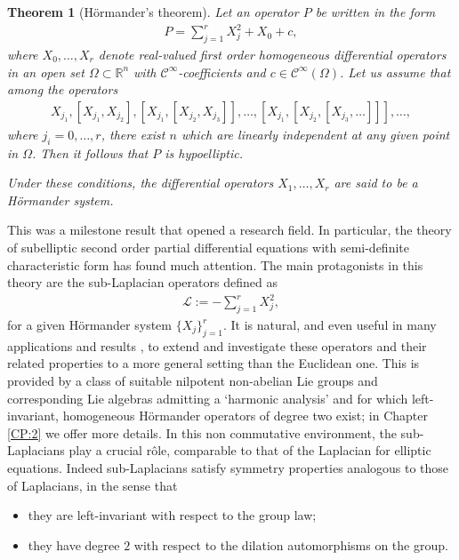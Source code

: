 \documentclass[12pt,oneside,a4paper]{book}
\numberwithin{equation}{section}     %
\theoremstyle{plain}
\newtheorem{theorem}{Theorem}[section]
\theoremstyle{definition}
\newcommand{\R}{{\mathbb R}}
\newcommand{\Rn}{{\R}^n}
\newcommand{\slp}{{\mathcal L}}
\begin{document}
\begin{theorem}[H\"ormander's theorem]\label{THM:Hormander}
	Let an operator $P$ be written in the form
	\begin{align}\label{EQ:HormOp}
	P=\sum_{j=1}^{r}X_j^2+X_0+c,
	\end{align}
	where $X_0,\dots,X_r$ denote real-valued first order homogeneous differential operators in an open set $\Omega\subset\Rn$ with $\mathcal{C}^\infty$-coefficients and $c\in\mathcal{C}^\infty(\Omega)$. Let us assume that among the operators 
	\begin{align*}
	X_{j_1},[X_{j_1},X_{j_2}],[X_{j_1},[X_{j_2},X_{j_3}]],\dots,[X_{j_1},[X_{j_2},[X_{j_3},\dots]]],\dots,
	\end{align*}
	where $j_i=0,\dots,r$, there exist $n$ which are linearly independent at any given point in $\Omega$. Then it follows that $P$ is hypoelliptic. 
	
	Under these conditions, the differential operators $X_1,\dots,X_r$ are said to be a \textit{H\"ormander system}.
\end{theorem}
This was a milestone result that opened a research field. In particular, the theory of subelliptic second order partial differential equations with semi-definite characteristic form has found much attention. 
The main protagonists in this theory are the sub-Laplacian operators defined as
\begin{align*}
\slp:=-\sum_{j=1}^r X_j^2,
\end{align*}
for a given H\"ormander system $\{X_j\}_{j=1}^r$. It is natural, and even useful in many applications and results \cite{F75,FS-CPAM,S1973}, to extend and investigate these operators and their related properties to a more general setting than the Euclidean one. This is provided by a class of suitable nilpotent non-abelian Lie groups and corresponding Lie algebras admitting a `harmonic analysis' and for which left-invariant, homogeneous H\"ormander operators of degree two exist; in Chapter \ref{CP:2} we offer more details. In this non commutative environment, the sub-Laplacians play a crucial r\^ole, comparable to that of the Laplacian for elliptic equations. Indeed sub-Laplacians satisfy symmetry properties analogous to those of Laplacians, in the sense that
\begin{itemize}
	\item they are left-invariant with respect to the group law;
	\item they have degree $2$ with respect to the dilation automorphisms on the group.
\end{itemize} 
\end{document}
